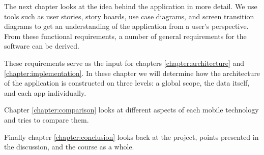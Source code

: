 The next chapter looks at the idea behind the application in more detail. We use tools such as user stories, story boards, use case diagrams, and screen transition diagrams to get an understanding of the application from a user's perspective. From these functional requirements, a number of general requirements for the software can be derived.

These requirements serve as the input for chapters \ref{chapter:architecture} and \ref{chapter:implementation}. In these chapter we will determine how the architecture of the application is constructed on three levels: a global scope, the data itself, and each app individually.

Chapter \ref{chapter:comparison} looks at different aspects of each mobile technology and tries to compare them.

Finally chapter \ref{chapter:conclusion} looks back at the project, points presented in the discussion, and the course as a whole.


